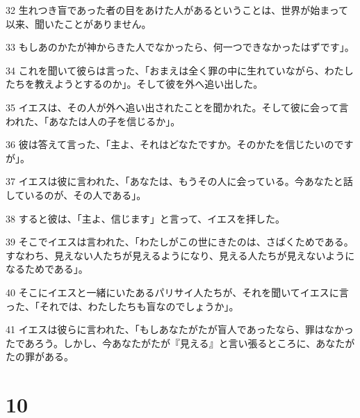\par 32 生れつき盲であった者の目をあけた人があるということは、世界が始まって以来、聞いたことがありません。
\par 33 もしあのかたが神からきた人でなかったら、何一つできなかったはずです」。
\par 34 これを聞いて彼らは言った、「おまえは全く罪の中に生れていながら、わたしたちを教えようとするのか」。そして彼を外へ追い出した。
\par 35 イエスは、その人が外へ追い出されたことを聞かれた。そして彼に会って言われた、「あなたは人の子を信じるか」。
\par 36 彼は答えて言った、「主よ、それはどなたですか。そのかたを信じたいのですが」。
\par 37 イエスは彼に言われた、「あなたは、もうその人に会っている。今あなたと話しているのが、その人である」。
\par 38 すると彼は、「主よ、信じます」と言って、イエスを拝した。
\par 39 そこでイエスは言われた、「わたしがこの世にきたのは、さばくためである。すなわち、見えない人たちが見えるようになり、見える人たちが見えないようになるためである」。
\par 40 そこにイエスと一緒にいたあるパリサイ人たちが、それを聞いてイエスに言った、「それでは、わたしたちも盲なのでしょうか」。
\par 41 イエスは彼らに言われた、「もしあなたがたが盲人であったなら、罪はなかったであろう。しかし、今あなたがたが『見える』と言い張るところに、あなたがたの罪がある。

\chapter{10}

